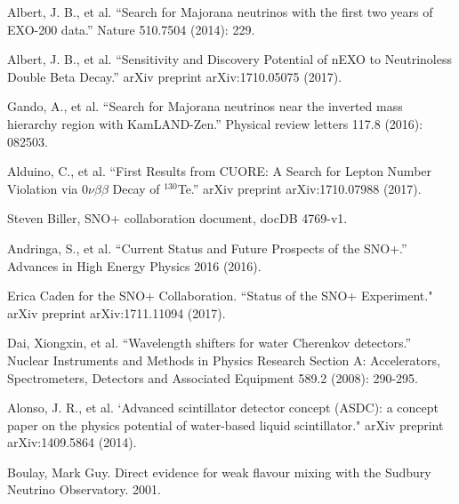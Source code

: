 \documentclass[preprint,12pt]{elsarticle}
\numberwithin{equation}{section}
\begin{document}
\begin{thebibliography}{00}
	 Albert, J. B., et al. ``Search for Majorana neutrinos with the first two years of EXO-200 data.'' Nature 510.7504 (2014): 229.
	
	 Albert, J. B., et al. ``Sensitivity and Discovery Potential of nEXO to Neutrinoless Double Beta Decay.'' arXiv preprint arXiv:1710.05075 (2017).
	
	
	 Gando, A., et al. ``Search for Majorana neutrinos near the inverted mass hierarchy region with KamLAND-Zen.'' Physical review letters 117.8 (2016): 082503.
	
	 Alduino, C., et al. ``First Results from CUORE: A Search for Lepton Number Violation via $0\nu\beta\beta$ Decay of $^{130}$Te.'' arXiv preprint arXiv:1710.07988 (2017).
	
	 Steven Biller, SNO+ collaboration document, docDB 4769-v1.
	
	 Andringa, S., et al. ``Current Status and Future Prospects of the SNO+.'' Advances in High Energy Physics 2016 (2016).
	
	 Erica Caden for the SNO+ Collaboration. ``Status of the SNO+ Experiment." arXiv preprint arXiv:1711.11094 (2017).
	
	
	 Dai, Xiongxin, et al. ``Wavelength shifters for water Cherenkov detectors.'' Nuclear Instruments and Methods in Physics Research Section A: Accelerators, Spectrometers, Detectors and Associated Equipment 589.2 (2008): 290-295.
	
	 Alonso, J. R., et al. `Advanced scintillator detector concept (ASDC): a concept paper on the physics potential of water-based liquid scintillator." arXiv preprint arXiv:1409.5864 (2014).
	
	 Boulay, Mark Guy. Direct evidence for weak flavour mixing with the Sudbury Neutrino Observatory. 2001.
	
	
	
\end{thebibliography}
\end{document}
